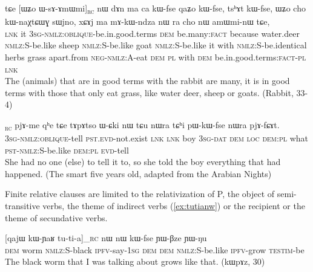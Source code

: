 \documentclass[oldfontcommands,oneside,a4paper,11pt]{article}
\newcommand{\ipa}[1]{{\phon #1}} %
\newcommand{\topic}{\textsc{dem}}
\newcommand{\rc}{\textsubscript{\textsc{rc}}}
\begin{document}
     \begin{exe}
   \ex \label{ex:WsAmWmi}
 \gll 
\ipa{tɕe}   	[\ipa{ɯʑo}   	\ipa{ɯ-sɤ-ɤmɯmi}]\rc{}   	\ipa{nɯ}   	\ipa{dɤn}   	\ipa{ma}   	\ipa{ca}   	\ipa{kɯ-fse}   	\ipa{qaʑo}   	\ipa{kɯ-fse,}   	\ipa{tsʰɤt}   	\ipa{kɯ-fse,}   	 \ipa{ɯʑo}   	\ipa{cho}   	\ipa{kɯ-naχtɕɯɣ}   	\ipa{sɯjno,}   	\ipa{xɕɤj}   	\ipa{ma}   	\ipa{mɤ-kɯ-ndza}   	\ipa{nɯ} \ipa{ra}   	\ipa{cho}   	\ipa{nɯ}   	\ipa{amɯmi-nɯ}   	\ipa{tɕe,}   \\
\textsc{lnk} it \textsc{3sg-nmlz:oblique}-be.in.good.terms \topic{}  be.many:\textsc{fact} because water.deer \textsc{nmlz:S}-be.like sheep \textsc{nmlz:S}-be.like goat  \textsc{nmlz:S}-be.like it with  \textsc{nmlz:S}-be.identical herbs grass apart.from \textsc{neg-nmlz:A}-eat \textsc{dem} \textsc{pl} with \textsc{dem}  be.in.good.terms:\textsc{fact}-\textsc{pl} \textsc{lnk} \\
\glt The (animals) that are in good terms with the rabbit are many, it is in good terms with those that only eat grass, like water deer, sheep or goats. (Rabbit, 33-4)
\end{exe}

\begin{exe}
\ex \label{ex:WsAfCAt}
\gll
[\ipa{ɯ-sɤ-fɕɤt}]\rc{} 
\ipa{pjɤ-me} 	\ipa{qʰe} 	\ipa{tɕe} 	\ipa{tɤpɤtso} 	\ipa{ɯ-ɕki} 	\ipa{nɯ} 	\ipa{tɕu} 	\ipa{nɯra} 	\ipa{tɕʰi} 	\ipa{pɯ-kɯ-fse} 	\ipa{nɯra} 	\ipa{pjɤ-fɕɤt.} \\
\textsc{3sg-nmlz:oblique}-tell \textsc{pst.evd}-not.exist \textsc{lnk} \textsc{lnk} boy \textsc{3sg-dat} \textsc{dem} \textsc{loc} \textsc{dem:pl} what \textsc{pst-nmlz:S}-be.like  \textsc{dem:pl} \textsc{evd}-tell \\
\glt She had no one (else) to tell it to, so she told the boy everything that had happened. (The smart five years old, adapted from the Arabian Nights)
\end{exe} 

Finite relative clauses are limited to the relativization of P, the object of semi-transitive verbs, the theme of indirect verbs (\ref{ex:tutianw}) or the recipient or the theme of secundative verbs.

     \begin{exe}
   \ex \label{ex:tutianw}
 \gll \ipa{nɯ}  	[\ipa{qajɯ}  	\ipa{kɯ-ɲaʁ}  	\ipa{tu-ti-a}]_{\textsc{rc}}  	\ipa{nɯ}  	\ipa{nɯ}  	\ipa{kɯ-fse}  	\ipa{ɲɯ-βze}  	\ipa{ɲɯ-ŋu}  \\
\textsc{dem} worm \textsc{nmlz:S}-black \textsc{ipfv}-say-\textsc{1sg} \textsc{dem}  \textsc{dem} \textsc{nmlz:S}-be.like \textsc{ipfv}-grow \textsc{testim}-be \\
\glt The black worm that I was talking about grows like that. (\ipa{kɯpɤz}, 30)
\end{exe}
\end{document}
